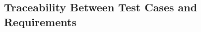 \documentclass[12pt, titlepage]{article}
\begin{document}
    					
    					
    					
    					




    					
    					
    					
    					

\subsection{Traceability Between Test Cases and Requirements}
\end{document}
